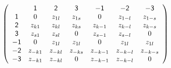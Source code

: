 \documentclass[aps,preprint]{revtex4}%
\begin{document}
\begin{equation}
\left(
\begin{array}
[c]{ccccccc}
& \mathsf{1} & \mathsf{2} & \mathsf{3} & \mathsf{-1} & \mathsf{-2} &
\mathsf{-3}\\
\mathsf{1} & 0 & z_{1l} & z_{1s} & 0 & z_{1-l} & z_{1-s}\\
\mathsf{2} & z_{k1} & z_{kl} & z_{ks} & z_{k-1} & z_{k-l} & z_{k-s}\\
\mathsf{3} & z_{s1} & z_{sl} & 0 & z_{s-1} & z_{s-l} & 0\\
\mathsf{-1} & 0 & z_{1l} & z_{1l} & 0 & z_{1l} & z_{1l}\\
-\mathsf{2} & z_{-k1} & z_{-kl} & z_{-ks} & z_{-k-1} & z_{-k-l} & z_{-k-s}\\
\mathsf{-3} & z_{-k1} & z_{-kl} & 0 & z_{-k-1} & z_{-k-l} & 0
\end{array}
\right)
\end{equation}%
\end{document}
